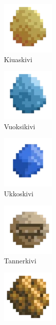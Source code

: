 \documentclass[11pt]{article}
\begin{document}
    \begin{figure}[ht]
        \begin{subfigure}{7em}
            \centering
            \includegraphics[width=7em]{./imgs/Item_brimstone}
            \caption{Kiuaskivi}
        \end{subfigure}
        \begin{subfigure}{7em}
            \centering
            \includegraphics[width=7em]{./imgs/Item_waterstone}
            \caption{Vuoksikivi}
        \end{subfigure}
        \begin{subfigure}{7em}
            \centering
            \includegraphics[width=7em]{./imgs/Item_thunderstone}
            \caption{Ukkoskivi}
        \end{subfigure}
        \begin{subfigure}{7em}
            \centering
            \includegraphics[width=7em]{./imgs/Item_stonestone}
            \caption{Tannerkivi}
        \end{subfigure}
        \begin{subfigure}{7em}
            \centering
            \includegraphics[width=7em]{./imgs/Item_kakke}

\end{subfigure}
\end{figure}
\end{document}
